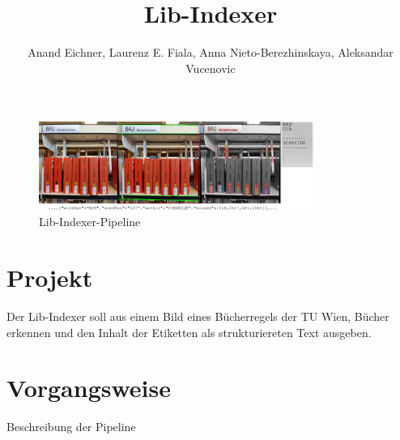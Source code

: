 \documentclass[deutsch]{scrartcl}
\begin{document}
\title{Lib-Indexer} %

\author{Anand Eichner, Laurenz E. Fiala, Anna Nieto-Berezhinskaya, Aleksandar Vucenovic}
\date{\vspace{-5ex}}




\maketitle

\begin{figure}[h!]
	
	\centering
	\includegraphics[width=0.8\textwidth]{poster.png}
	\caption{Lib-Indexer-Pipeline}
	\label{fig:erg}
\end{figure}


\section*{Projekt}
Der Lib-Indexer soll aus einem Bild eines Bücherregels der TU Wien, Bücher erkennen und den Inhalt der Etiketten als strukturiereten Text ausgeben.

\section*{Vorgangsweise}

Beschreibung der Pipeline
\end{document}

